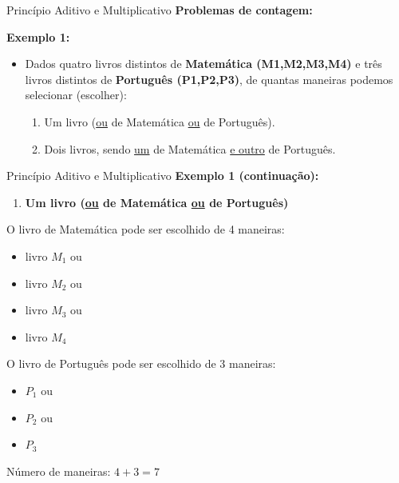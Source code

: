 \documentclass[aspectratio=169]{beamer}
\begin{document}
\begin{frame}{Princípio Aditivo e Multiplicativo}
    \textbf{Problemas de contagem:}

    \vspace{4mm}

  \textbf{  Exemplo 1:}

    \vspace{3mm}
    \begin{itemize}
        \item Dados quatro livros distintos de \textbf{Matemática (M1,M2,M3,M4)} e três livros distintos de \textbf{Português (P1,P2,P3)}, de quantas maneiras podemos selecionar (escolher):
        
        \vspace{3mm}
        \begin{enumerate}[a]
            \item Um livro (\underline{ou} de Matemática \underline{ou} de Português).
            \item Dois livros, sendo \underline{um} de Matemática \underline{e outro} de Português.
        \end{enumerate}
    
        
    \end{itemize}

\end{frame}

\begin{frame}{Princípio Aditivo e Multiplicativo}
    \textbf{Exemplo 1 (continuação):}

    \vspace{3mm}

    \begin{enumerate}[a]
        \item \textbf{Um livro (\underline{ou} de Matemática \underline{ou} de Português)}
    \end{enumerate}
        
    O livro de Matemática pode ser escolhido de 4 maneiras:
    \begin{itemize}
        \item livro $M_1$ ou 
        \item livro $ M_2 $ ou
        \item livro $ M_3 $ ou
        \item livro $M_4$
    \end{itemize}
    
    
    O livro de Português pode ser escolhido de 3 maneiras:

    \begin{itemize}
        \item $P_1$ ou
        \item $P_2 $ ou 
        \item $ P_3$
    \end{itemize}
    
    
    Número de maneiras: $4 + 3 = 7$
\end{frame}
\end{document}
